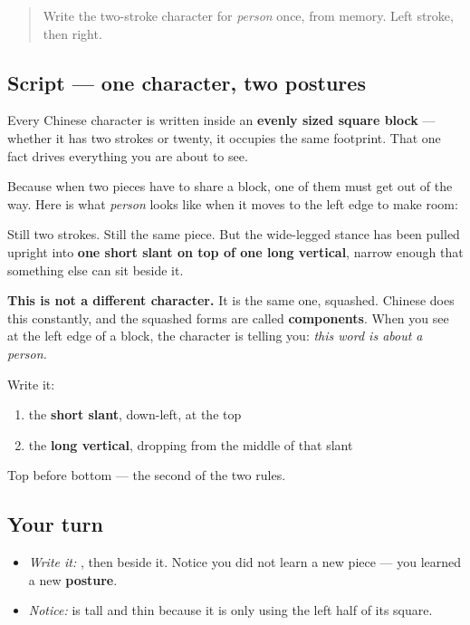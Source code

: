 \label{lesson:ZH-W01-ren-radical}



\begin{quote}
Write the two-stroke character for \emph{person} once, from memory. Left stroke, then right.
\end{quote}

\subsection*{Script — one character, two postures}

Every Chinese character is written inside an \textbf{evenly sized square block} — whether it has two strokes or twenty, it occupies the same footprint. That one fact drives everything you are about to see.

Because when two pieces have to share a block, one of them must get out of the way. Here is what \emph{person} looks like when it moves to the left edge to make room:

\begin{quote}
\end{quote}

Still two strokes. Still the same piece. But the wide-legged stance has been pulled upright into \textbf{one short slant on top of one long vertical}, narrow enough that something else can sit beside it.

\textbf{This is not a different character.} It is the same one, squashed. Chinese does this constantly, and the squashed forms are called \textbf{components}. When you see  at the left edge of a block, the character is telling you: \emph{this word is about a person.}

Write it:

\begin{enumerate}
\raggedright
  \item the \textbf{short slant}, down-left, at the top
  \item the \textbf{long vertical}, dropping from the middle of that slant
\end{enumerate}

Top before bottom — the second of the two rules.

\subsection*{Your turn}
\begin{itemize}
\raggedright
  \item \emph{Write it:} , then  beside it. Notice you did not learn a new piece — you learned a new \textbf{posture}.
  \item \emph{Notice:}  is tall and thin because it is only using the left half of its square.
\end{itemize}


